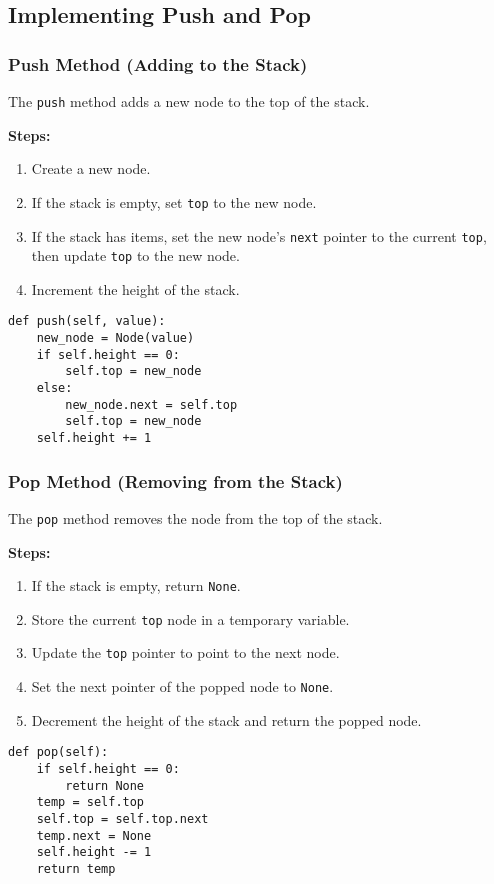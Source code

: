 \subsection{Implementing Push and Pop}

\subsubsection*{Push Method (Adding to the Stack)}
The \texttt{push} method adds a new node to the top of the stack.

\textbf{Steps:}
\begin{enumerate}
    \item Create a new node.
    \item If the stack is empty, set \texttt{top} to the new node.
    \item If the stack has items, set the new node's \texttt{next} pointer to the current \texttt{top}, then update \texttt{top} to the new node.
    \item Increment the height of the stack.
\end{enumerate}

\begin{verbatim}
def push(self, value):
    new_node = Node(value)
    if self.height == 0:
        self.top = new_node
    else:
        new_node.next = self.top
        self.top = new_node
    self.height += 1
\end{verbatim}

\subsubsection*{Pop Method (Removing from the Stack)}
The \texttt{pop} method removes the node from the top of the stack.

\textbf{Steps:}
\begin{enumerate}
    \item If the stack is empty, return \texttt{None}.
    \item Store the current \texttt{top} node in a temporary variable.
    \item Update the \texttt{top} pointer to point to the next node.
    \item Set the next pointer of the popped node to \texttt{None}.
    \item Decrement the height of the stack and return the popped node.
\end{enumerate}

\begin{verbatim}
def pop(self):
    if self.height == 0:
        return None
    temp = self.top
    self.top = self.top.next
    temp.next = None
    self.height -= 1
    return temp
\end{verbatim}

